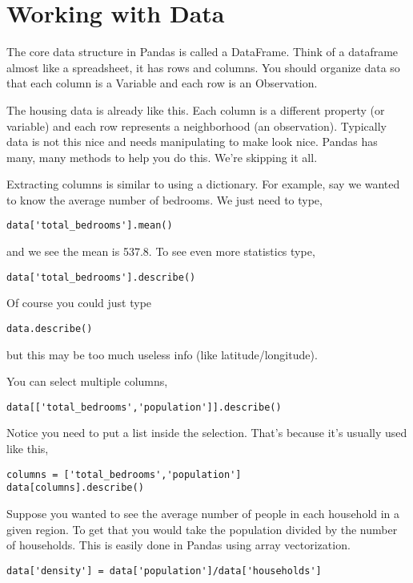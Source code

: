\documentclass[11pt,letterpaper]{article}
\begin{document}
\section{Working with Data}
The core data structure in Pandas is called a DataFrame. Think of a dataframe almost like a spreadsheet,
it has rows and columns. You should organize data so that each column is a Variable and each
row is an Observation. 

The housing data is already like this. Each column is a different property (or variable) and each
row represents a neighborhood (an observation). Typically data is not this nice and needs manipulating 
to make look nice. Pandas has many, many methods to help you do this. We're skipping it all.


Extracting columns is similar to using a dictionary. For example, say we wanted to know the average 
number of bedrooms. We just need to type,
\begin{verbatim}
data['total_bedrooms'].mean()
\end{verbatim}
and we see the mean is 537.8. To see even more statistics type,
\begin{verbatim}
data['total_bedrooms'].describe()
\end{verbatim}
Of course you could just type 
\begin{verbatim}
data.describe()
\end{verbatim}
but this may be too much useless info (like latitude/longitude). 

You can select multiple columns,
\begin{verbatim}
data[['total_bedrooms','population']].describe()
\end{verbatim}
Notice you need to put a list inside the selection. That's because it's usually used like this,
\begin{verbatim}
columns = ['total_bedrooms','population']
data[columns].describe()
\end{verbatim}


Suppose you wanted to see the average number of people in each household in a given region.
To get that you would take the population divided by the number of households. This is easily
done in Pandas using array vectorization.
\begin{verbatim}
data['density'] = data['population']/data['households']
\end{verbatim}
\end{document}
